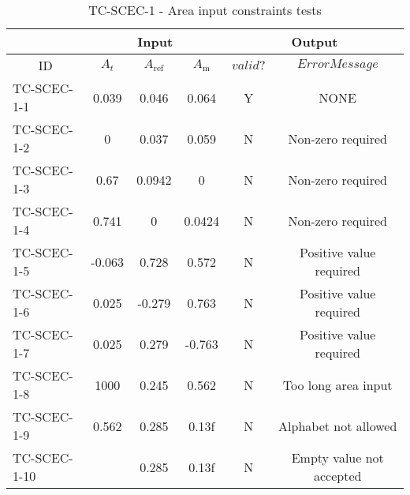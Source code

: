 \documentclass[12pt, titlepage]{article}
\begin{document}
\begin{table}[h!]
\begin{center}
\begin{tabular}{ lccccc }
\hline
\multicolumn{1}{l|}{}   & \multicolumn{3}{c|}{Input}                            & \multicolumn{2}{c}{Output} \\ 

\hline

\multicolumn{1}{c|}{ID} &   ${A_t}$   &   $A_\text{ref}$   &   \multicolumn{1}{c|}{${A_{\text{m}}}$}   &   $valid?$   &   $Error Message$ \\ \hline

TC-SCEC-1-1   &   0.039  & 0.046  & 0.064    &  Y  & NONE                         \\
TC-SCEC-1-2   &   0      & 0.037  & 0.059    &  N  & Non-zero required            \\
TC-SCEC-1-3   &   0.67   & 0.0942 & 0        &  N  & Non-zero required            \\ 
TC-SCEC-1-4   &   0.741  & 0      & 0.0424   &  N  & Non-zero required            \\
TC-SCEC-1-5   &   -0.063 & 0.728  & 0.572    &  N  & Positive value required      \\
TC-SCEC-1-6   &   0.025  & -0.279 & 0.763    &  N  & Positive value required      \\
TC-SCEC-1-7   &   0.025  & 0.279  & -0.763   &  N  & Positive value required      \\
TC-SCEC-1-8   &   1000   & 0.245  & 0.562    &  N  & Too long area input          \\
TC-SCEC-1-9   &   0.562  & 0.285  & 0.13f    &  N  & Alphabet not allowed         \\ 
TC-SCEC-1-10   &    & 0.285  & 0.13f    &  N  & Empty value not accepted         \\ 

\hline


\end{tabular}
\caption{TC-SCEC-1 - Area input constraints tests}
\label{tab:tc-SCEC-1}
\end{center}
\end{table}
\end{document}
